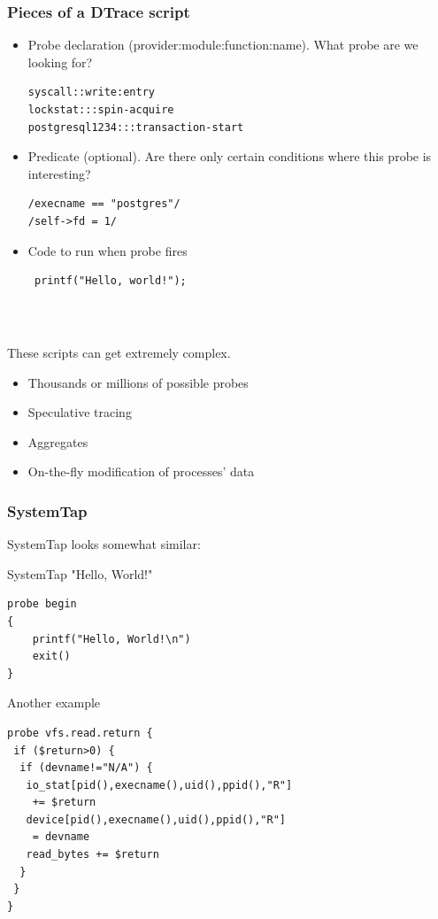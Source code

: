 \documentclass{beamer}
\begin{document}
\begin{frame}[fragile]
    \frametitle{Pieces of a DTrace script}
    \begin{itemize}
         \item<1-> Probe declaration (provider:module:function:name). What probe are we looking for?
         \begin{verbatim}
syscall::write:entry
lockstat:::spin-acquire
postgresql1234:::transaction-start
         \end{verbatim}
         \item<2-> Predicate (optional). Are there only certain conditions where this probe is interesting?
         \begin{verbatim}
/execname == "postgres"/
/self->fd = 1/
         \end{verbatim}
         \item<3-> Code to run when probe fires
         \begin{verbatim}
 printf("Hello, world!");
         \end{verbatim}
    \end{itemize}
\end{frame}

\begin{frame}
    \frametitle{~}
     These scripts can get extremely complex.
     \begin{itemize}
         \item Thousands or millions of possible probes
         \item Speculative tracing
         \item Aggregates
         \item On-the-fly modification of processes' data
     \end{itemize}
\end{frame}

\begin{frame}[fragile]
     \frametitle{SystemTap}
     SystemTap looks somewhat similar:
     \begin{exampleblock}{SystemTap "Hello, World!"}
     \begin{lstlisting}
probe begin
{
    printf("Hello, World!\n")
    exit()
}
     \end{lstlisting}
     \end{exampleblock}
\end{frame}

\begin{frame}[fragile]
     \begin{exampleblock}{Another example}
     \begin{lstlisting}
probe vfs.read.return {
 if ($return>0) {
  if (devname!="N/A") {
   io_stat[pid(),execname(),uid(),ppid(),"R"]
    += $return
   device[pid(),execname(),uid(),ppid(),"R"]
    = devname
   read_bytes += $return
  }
 }
}
     \end{lstlisting}
     \end{exampleblock}
\end{frame}
\end{document}

